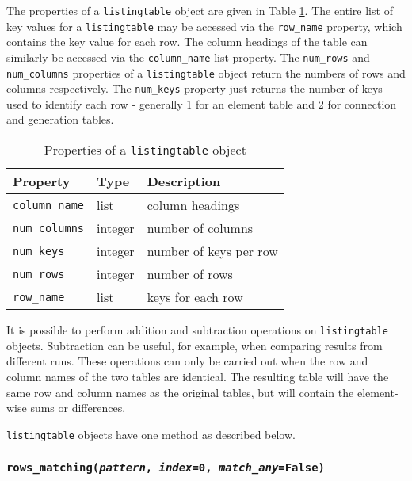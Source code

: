 The properties of a \texttt{listingtable} object are given in Table \ref{tb:listingtable_properties}.  The entire list of key values for a \texttt{listingtable} may be accessed via the \texttt{row\_name} property, which contains the key value for each row.  The column headings of the table can similarly be accessed via the \texttt{column\_name} list property.  The \texttt{num\_rows} and \texttt{num\_columns} properties of a \texttt{listingtable} object return the numbers of rows and columns respectively.  The \texttt{num\_keys} property just returns the number of keys used to identify each row - generally 1 for an element table and 2 for connection and generation tables.

\begin{table}
  \begin{center}
    \begin{tabular}{|l|l|l|}
      \hline
      \textbf{Property} & \textbf{Type} & \textbf{Description}\\
      \hline
      \texttt{column\_name} & list & column headings\\
      \texttt{num\_columns} & integer & number of columns \\
      \texttt{num\_keys} & integer & number of keys per row \\
      \texttt{num\_rows} & integer & number of rows \\
      \texttt{row\_name} & list & keys for each row \\
      \hline
    \end{tabular}
    \caption{Properties of a \texttt{listingtable} object}
    \label{tb:listingtable_properties}
  \end{center}
\end{table}

It is possible to perform addition and subtraction operations on \texttt{listingtable} objects.  Subtraction can be useful, for example, when comparing results from different runs.  These operations can only be carried out when the row and column names of the two tables are identical.  The resulting table will have the same row and column names as the original tables, but will contain the element-wise sums or differences.

\texttt{listingtable} objects have one method as described below.

\begin{snugshade}
\subsubsection{\texttt{rows\_matching(\emph{pattern}, \emph{index}=0, \emph{match\_any}=False)}}
\end{snugshade}

